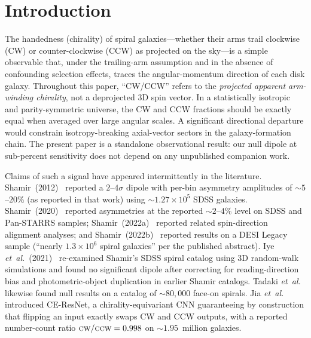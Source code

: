 \documentclass[aps,prd,twocolumn,superscriptaddress,preprintnumbers,nofootinbib,longbibliography,floatfix]{revtex4-2}
\newcommand{\CW}{\textsc{cw}}
\newcommand{\CCW}{\textsc{ccw}}
\newcommand{\sigmaunit}{\sigma}
\begin{document}
\section{Introduction}
\label{sec:intro}

The handedness (chirality) of spiral galaxies---whether their arms trail clockwise (CW) or counter-clockwise (CCW) as projected on the sky---is a simple observable that, under the trailing-arm assumption and in the absence of confounding selection effects, traces the angular-momentum direction of each disk galaxy. Throughout this paper, ``CW/CCW'' refers to the \emph{projected apparent arm-winding chirality}, not a deprojected 3D spin vector. In a statistically isotropic and parity-symmetric universe, the CW and CCW fractions should be exactly equal when averaged over large angular scales. A significant directional departure would constrain isotropy-breaking axial-vector sectors in the galaxy-formation chain. The present paper is a standalone observational result: our null dipole at sub-percent sensitivity does not depend on any unpublished companion work.

Claims of such a signal have appeared intermittently in the literature. Shamir~(2012)~\cite{Shamir:2012} reported a $2\text{--}4\sigmaunit$ dipole with per-bin asymmetry amplitudes of $\sim\!5$--$20\%$ (as reported in that work) using $\sim\!1.27\!\times\!10^{5}$ SDSS galaxies. Shamir~(2020)~\cite{Shamir:2020} reported asymmetries at the reported $\sim\!2$--$4\%$ level on SDSS and Pan-STARRS samples; Shamir~(2022a)~\cite{Shamir:2022} reported related spin-direction alignment analyses; and Shamir~(2022b)~\cite{Shamir:2022DESI} reported results on a DESI Legacy sample (``nearly $1.3\!\times\!10^{6}$ spiral galaxies'' per the published abstract). Iye \textit{et~al.}~(2021)~\cite{Iye:2021} re-examined Shamir's SDSS spiral catalog using 3D random-walk simulations and found no significant dipole after correcting for reading-direction bias and photometric-object duplication in earlier Shamir catalogs. Tadaki \textit{et~al.}~\cite{Tadaki:2020} likewise found null results on a catalog of $\sim\!80{,}000$ face-on spirals. Jia \textit{et~al.}~\cite{Jia:2023} introduced CE-ResNet, a chirality-equivariant CNN guaranteeing by construction that flipping an input exactly swaps CW and CCW outputs, with a reported number-count ratio $\CW/\CCW = 0.998$ on $\sim\!1.95$~million galaxies.
\end{document}

